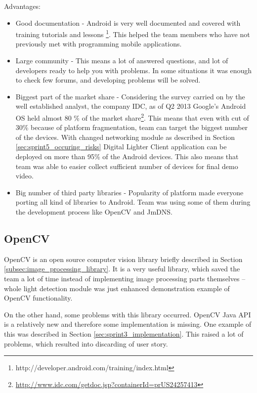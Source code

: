 Advantages:
\begin{itemize}
\item Good documentation - Android is very well documented and covered with training tutorials and lessons \footnote{http://developer.android.com/training/index.html}. This helped the team members who have not previously met with programming mobile applications. 

\item Large community - This means a lot of answered questions, and lot of developers ready to help you with problems. In some situations it was enough to check few forums, and developing problems will be solved.

\item Biggest part of the market share - Considering the survey carried on by the well established analyst, the company IDC, as of Q2 2013 Google's Android OS held almost 80 \% of the market share\footnote{\url{http://www.idc.com/getdoc.jsp?containerId=prUS24257413}}. This means that even with cut of 30\% because of platform fragmentation, team can target the biggest number of the devices. With changed networking module as described in Section \ref{sec:sprint5_occuring_risks} Digital Lighter Client application can be deployed on more than 95\% of the Android devices. This also means that team was able to easier collect sufficient number of devices for final demo video.

\item Big number of third party libraries - Popularity of platform made everyone porting all kind of libraries to Android. Team was using some of them during the development process like OpenCV and JmDNS. 
\end{itemize}

\subsection{OpenCV} \label{subsec:openCV_reflection}

OpenCV is an open source computer vision library briefly described in Section \ref{subsec:image_processing_library}.
It is a very useful library, which saved the team a lot of time instead of implementing image processing parts themselves
 -- whole light detection module was just enhanced demonstration example of OpenCV functionality.

On the other hand, some problems with this library occurred.
OpenCV Java API is a relatively new and therefore some implementation is missing.
One example of this was described in Section \ref{sec:sprint3_implementation}.
This raised a lot of problems, which resulted into discarding of user story.

